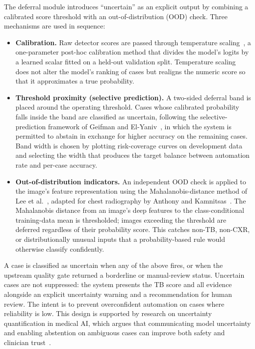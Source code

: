 \documentclass[conference, letterpaper]{IEEEtran}
\begin{document}
The deferral module introduces ``uncertain'' as an explicit output by combining a calibrated score threshold with an out-of-distribution (OOD) check. Three mechanisms are used in sequence:

\begin{itemize}
    \item \textbf{Calibration.} Raw detector scores are passed through temperature scaling~\cite{guo2017calibration}, a one-parameter post-hoc calibration method that divides the model's logits by a learned scalar fitted on a held-out validation split. Temperature scaling does not alter the model's ranking of cases but realigns the numeric score so that it approximates a true probability.
    \item \textbf{Threshold proximity (selective prediction).} A two-sided deferral band is placed around the operating threshold. Cases whose calibrated probability falls inside the band are classified as uncertain, following the selective-prediction framework of Geifman and El-Yaniv~\cite{geifman2017selective}, in which the system is permitted to abstain in exchange for higher accuracy on the remaining cases. Band width is chosen by plotting risk-coverage curves on development data and selecting the width that produces the target balance between automation rate and per-case accuracy.
    \item \textbf{Out-of-distribution indicators.} An independent OOD check is applied to the image's feature representation using the Mahalanobis-distance method of Lee et al.~\cite{lee2018mahalanobis}, adapted for chest radiography by Anthony and Kamnitsas~\cite{anthony2023mahalanobis_medical}. The Mahalanobis distance from an image's deep features to the class-conditional training-data mean is thresholded; images exceeding the threshold are deferred regardless of their probability score. This catches non-TB, non-CXR, or distributionally unusual inputs that a probability-based rule would otherwise classify confidently.
\end{itemize}

A case is classified as uncertain when any of the above fires, or when the upstream quality gate returned a borderline or manual-review status. Uncertain cases are not suppressed: the system presents the TB score and all evidence alongside an explicit uncertainty warning and a recommendation for human review. The intent is to prevent overconfident automation on cases where reliability is low. This design is supported by research on uncertainty quantification in medical AI, which argues that communicating model uncertainty and enabling abstention on ambiguous cases can improve both safety and clinician trust~\cite{kompa2021uncertainty, muehlematter2024uq_review}.
\end{document}
